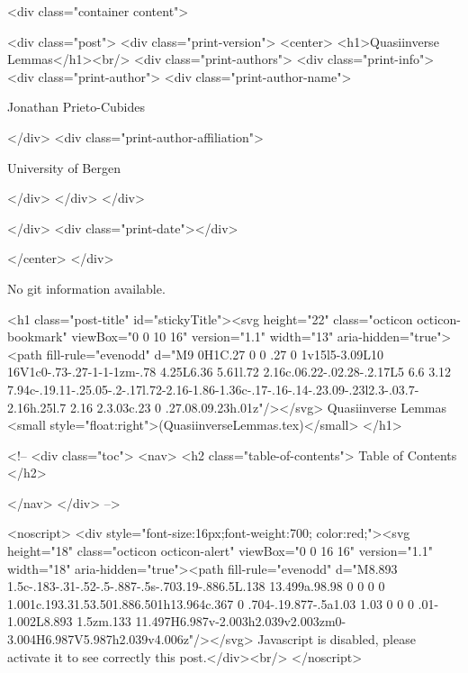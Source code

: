       <div class="container content">
        







<div class="post">
  <div class="print-version">
    <center>
      <h1>Quasiinverse Lemmas</h1><br/>
        <div class="print-authors">
          <div class="print-info">
            <div class="print-author">
              <div class="print-author-name">
                
                  Jonathan Prieto-Cubides
                
              </div>
              <div class="print-author-affiliation">
                
                  University of Bergen
                
                </div>
            </div>
          </div>
          
          
        </div>
        <div class="print-date"></div>
        
        
    </center>
  </div>

  
  No git information available.
  

  <h1 class="post-title" id="stickyTitle"><svg height="22" class="octicon octicon-bookmark" viewBox="0 0 10 16" version="1.1" width="13" aria-hidden="true"><path fill-rule="evenodd" d="M9 0H1C.27 0 0 .27 0 1v15l5-3.09L10 16V1c0-.73-.27-1-1-1zm-.78 4.25L6.36 5.61l.72 2.16c.06.22-.02.28-.2.17L5 6.6 3.12 7.94c-.19.11-.25.05-.2-.17l.72-2.16-1.86-1.36c-.17-.16-.14-.23.09-.23l2.3-.03.7-2.16h.25l.7 2.16 2.3.03c.23 0 .27.08.09.23h.01z"/></svg> Quasiinverse Lemmas <small style="float:right">(QuasiinverseLemmas.tex)</small>
  </h1>

  <!-- 
  <div class="toc">
    <nav>
    <h2 class="table-of-contents"> Table of Contents </h2>
      

    </nav>
  </div>
   -->

  <noscript>
  <div style="font-size:16px;font-weight:700; color:red;"><svg height="18" class="octicon octicon-alert" viewBox="0 0 16 16" version="1.1" width="18" aria-hidden="true"><path fill-rule="evenodd" d="M8.893 1.5c-.183-.31-.52-.5-.887-.5s-.703.19-.886.5L.138 13.499a.98.98 0 0 0 0 1.001c.193.31.53.501.886.501h13.964c.367 0 .704-.19.877-.5a1.03 1.03 0 0 0 .01-1.002L8.893 1.5zm.133 11.497H6.987v-2.003h2.039v2.003zm0-3.004H6.987V5.987h2.039v4.006z"/></svg> Javascript is disabled, please activate it to see correctly this post.</div><br/>
  </noscript>

